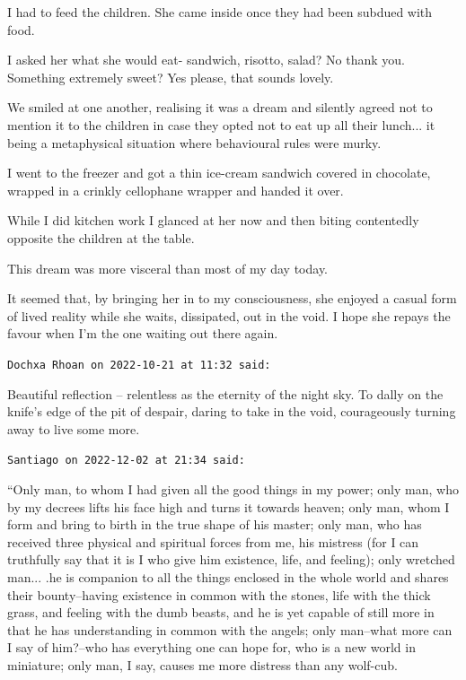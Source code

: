 \begin{footnotesize}
\begin{sffamily}
I had to feed the children. She came inside once they had been subdued with food.

I asked her what she would eat- sandwich, risotto, salad? No thank you. Something extremely sweet? Yes please, that sounds lovely.

We smiled at one another, realising it was a dream and silently agreed not to mention it to the children in case they opted not to eat up all their lunch... it being a metaphysical situation where behavioural rules were murky.

I went to the freezer and got a thin ice-cream sandwich covered in chocolate, wrapped in a crinkly cellophane wrapper and handed it over.

While I did kitchen work I glanced at her now and then biting contentedly opposite the children at the table.

This dream was more visceral than most of my day today.

It seemed that, by bringing her in to my consciousness, she enjoyed a casual form of lived reality while she waits, dissipated, out in the void. I hope she repays the favour when I'm the one waiting out there again.

\hfill

\texttt{Dochxa Rhoan on 2022-10-21 at 11:32 said:}

Beautiful reflection -- relentless as the eternity of the night sky. To dally on the knife's edge of the pit of despair, daring to take in the void, courageously turning away to live some more.

\hfill

\texttt{Santiago on 2022-12-02 at 21:34 said:}

``Only man, to whom I had given all the good things in my power; only man, who by my decrees lifts his face high and turns it towards heaven; only man, whom I form and bring to birth in the true shape of his master; only man, who has received three physical and spiritual forces from me, his mistress (for I can truthfully say that it is I who give him existence, life, and feeling); only wretched man... .he is companion to all the things enclosed in the whole world and shares their bounty--having existence in common with the stones, life with the thick grass, and feeling with the dumb beasts, and he is yet capable of still more in that he has understanding in common with the angels; only man--what more can I say of him?--who has everything one can hope for, who is a new world in miniature; only man, I say, causes me more distress than any wolf-cub.


\end{sffamily}
\end{footnotesize}
